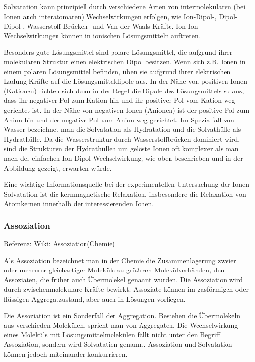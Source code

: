 \documentclass[]{article}
\begin{document}
Solvatation kann prinzipiell durch verschiedene Arten von intermolekularen (bei Ionen auch interatomaren) Wechselwirkungen erfolgen, wie Ion-Dipol-, Dipol-Dipol-, Wasserstoff-Brücken- und Van-der-Waals-Kräfte. Ion-Ion-Wechselwirkungen können in ionischen Lösungsmitteln auftreten.

Besonders gute Lösungsmittel sind polare Lösungsmittel, die aufgrund ihrer molekularen Struktur einen elektrischen Dipol besitzen. Wenn sich z.B. Ionen in einem polaren Lösungsmittel befinden, üben sie aufgrund ihrer elektrischen Ladung Kräfte auf die Lösungsmitteldipole aus. In der Nähe von positiven Ionen (Kationen) richten sich dann in der Regel die Dipole des Lösungsmittels so aus, dass ihr negativer Pol zum Kation hin und ihr positiver Pol vom Kation weg gerichtet ist. In der Nähe von negativen Ionen (Anionen) ist der positive Pol zum Anion hin und der negative Pol vom Anion weg gerichtet. Im Spezialfall von Wasser bezeichnet man die Solvatation als Hydratation und die Solvathülle als Hydrathülle. Da die Wasserstruktur durch Wasserstoffbrücken dominiert wird, sind die Strukturen der Hydrathüllen um gelöste Ionen oft komplexer als man nach der einfachen Ion-Dipol-Wechselwirkung, wie oben beschrieben und in der Abbildung gezeigt, erwarten würde.

Eine wichtige Informationsquelle bei der experimentellen Untersuchung der Ionen-Solvatation ist die kernmagnetische Relaxation, insbesondere die Relaxation von Atomkernen innerhalb der interessierenden Ionen.

\subsubsection{Assoziation}
Referenz: Wiki:  Assoziation(Chemie)

Als Assoziation bezeichnet man in der Chemie die Zusammenlagerung zweier oder mehrerer gleichartiger Moleküle zu größeren Molekülverbänden, den Assoziaten, die früher auch Übermolekel genannt wurden. Die Assoziation wird durch zwischenmolekulare Kräfte bewirkt. Assoziate können im gasförmigen oder flüssigen Aggregatzustand, aber auch in Lösungen vorliegen.

Die Assoziation ist ein Sonderfall der Aggregation. Bestehen die Übermolekeln aus verschieden Molekülen, spricht man von Aggregaten. Die Wechselwirkung eines Moleküls mit Lösungsmittelmolekülen fällt nicht unter den Begriff Assoziation, sondern wird Solvatation genannt. Assoziation und Solvatation können jedoch miteinander konkurrieren.
\end{document}
